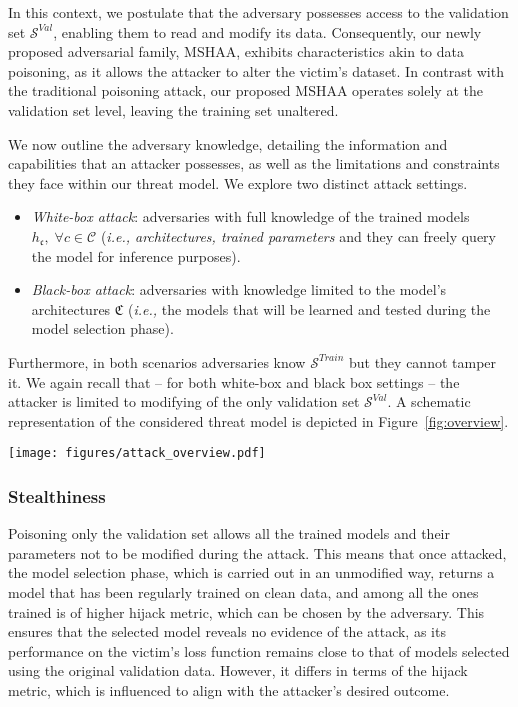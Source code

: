 In this context, we postulate that the adversary possesses access to the validation set $\mathcal{S}^{Val}$, enabling them to read and modify its data. Consequently, our newly proposed adversarial family, MSHAA, exhibits characteristics akin to data poisoning, as it allows the attacker to alter the victim’s dataset.
In contrast with the traditional poisoning attack, our proposed MSHAA operates solely at the validation set level, leaving the training set unaltered. 
\par
We now outline the adversary knowledge, detailing the information and capabilities that an attacker possesses, as well as the limitations and constraints they face within our threat model.
We explore two distinct attack settings.
\begin{itemize}
    \item \textit{White-box attack}: adversaries with full knowledge of the  trained models $h_{\mathfrak{c}}, \;  \forall c \in \mathcal{C}$ (\textit{i.e., architectures, trained parameters} and they can freely query the model for inference purposes).  
    \item \textit{Black-box attack}: adversaries with knowledge limited to the model's architectures $\mathfrak{C}$ (\textit{i.e.,} the models that will be learned and tested during the model selection phase). 
\end{itemize}
Furthermore, in both scenarios adversaries know $\mathcal{S}^{Train}$ but they cannot tamper it. 
We again recall that -- for both white-box and black box settings -- the attacker is limited to modifying of the only validation set $\mathcal{S}^{Val}$.
A schematic representation of the considered threat model is depicted in Figure~\ref{fig:overview}.

\begin{figure*}[!htpb]
    \centering
    \texttt{[image: figures/attack\_overview.pdf]}
    \caption{Schematic representation of the MSHAA threat model.}
    \label{fig:overview}
\end{figure*}


\subsubsection{Stealthiness}
Poisoning only the validation set allows all the trained models and their parameters not to be modified during the attack. This means that once attacked, the model selection phase, which is carried out in an unmodified way, returns a model that has been regularly trained on clean data, and among all the ones trained is of higher hijack metric, which can be chosen by the adversary. 
This ensures that the selected model reveals no evidence of the attack, as its performance on the victim's loss function remains close to that of models selected using the original validation data. However, it differs in terms of the hijack metric, which is influenced to align with the attacker’s desired outcome.

